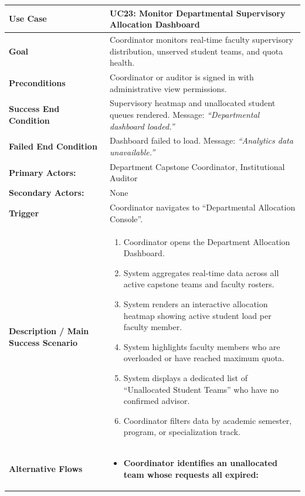 \begin{table}[H]
\centering
\small
\begin{tabularx}{\textwidth}{|l|X|}
\hline
\rowcolor{lightgray!40} \textbf{Use Case} & \textbf{UC23: Monitor Departmental Supervisory Allocation Dashboard} \\ \hline
\textbf{Goal} & Coordinator monitors real-time faculty supervisory distribution, unserved student teams, and quota health. \\ \hline
\textbf{Preconditions} & Coordinator or auditor is signed in with administrative view permissions. \\ \hline
\textbf{Success End Condition} & Supervisory heatmap and unallocated student queues rendered. Message: \textit{``Departmental dashboard loaded.''} \\ \hline
\textbf{Failed End Condition} & Dashboard failed to load. Message: \textit{``Analytics data unavailable.''} \\ \hline
\textbf{Primary Actors:} & Department Capstone Coordinator, Institutional Auditor \\
\textbf{Secondary Actors:} & None \\ \hline
\textbf{Trigger} & Coordinator navigates to ``Departmental Allocation Console''. \\ \hline
\textbf{Description / Main Success Scenario} &
\begin{enumerate}[leftmargin=*]
    \item Coordinator opens the Department Allocation Dashboard.
    \item System aggregates real-time data across all active capstone teams and faculty rosters.
    \item System renders an interactive allocation heatmap showing active student load per faculty member.
    \item System highlights faculty members who are overloaded or have reached maximum quota.
    \item System displays a dedicated list of ``Unallocated Student Teams'' who have no confirmed advisor.
    \item Coordinator filters data by academic semester, program, or specialization track.
\end{enumerate} \\ \hline
\textbf{Alternative Flows} &
\begin{itemize}[leftmargin=*]
    \item[\textbf{5.a.}] \textbf{Coordinator identifies an unallocated team whose requests all expired:}

\end{itemize}
\end{tabularx}
\end{table}
